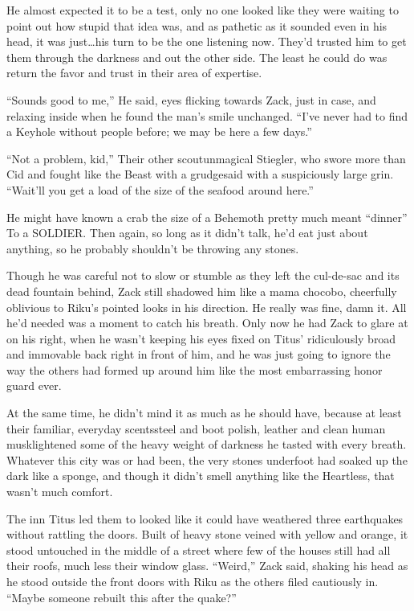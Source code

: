 He almost expected it to be a test, only no one looked like they were waiting to point out how stupid that idea was, and as pathetic as it sounded even in his head, it was just\ldots his turn to be the one listening now. They'd trusted him to get them through the darkness and out the other side. The least he could do was return the favor and trust in their area of expertise.

``Sounds good to me,'' He said, eyes flicking towards Zack, just in case, and relaxing inside when he found the man's smile unchanged. ``I've never had to find a Keyhole without people before; we may be here a few days.''

``Not a problem, kid,'' Their other scout\textemdash unmagical Stiegler, who swore more than Cid and fought like the Beast with a grudge\textemdash said with a suspiciously large grin. ``Wait'll you get a load of the size of the seafood around here.''

He might have known a crab the size of a Behemoth pretty much meant ``dinner'' To a SOLDIER. Then again, so long as it didn't talk, he'd eat just about anything, so he probably shouldn't be throwing any stones.

\scenechange

Though he was careful not to slow or stumble as they left the cul-de-sac and its dead fountain behind, Zack still shadowed him like a mama chocobo, cheerfully oblivious to Riku's pointed looks in his direction. He really was fine, damn it. All he'd needed was a moment to catch his breath. Only now he had Zack to glare at on his right, when he wasn't keeping his eyes fixed on Titus' ridiculously broad and immovable back right in front of him, and he was just going to ignore the way the others had formed up around him like the most embarrassing honor guard ever.

At the same time, he didn't mind it as much as he should have, because at least their familiar, everyday scents\textemdash steel and boot polish, leather and clean human musk\textemdash lightened some of the heavy weight of darkness he tasted with every breath. Whatever this city was or had been, the very stones underfoot had soaked up the dark like a sponge, and though it didn't smell anything like the Heartless, that wasn't much comfort.

The inn Titus led them to looked like it could have weathered three earthquakes without rattling the doors. Built of heavy stone veined with yellow and orange, it stood untouched in the middle of a street where few of the houses still had all their roofs, much less their window glass. ``Weird,'' Zack said, shaking his head as he stood outside the front doors with Riku as the others filed cautiously in. ``Maybe someone rebuilt this after the quake?''

